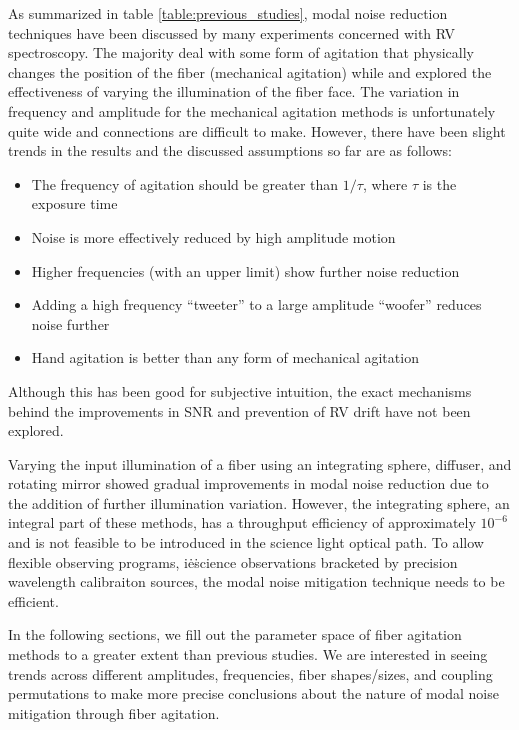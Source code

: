 \documentclass[twocolumn]{emulateapj}
\begin{document}
As summarized in table \ref{table:previous_studies}, modal noise reduction techniques have been discussed by many experiments concerned with RV spectroscopy. The majority deal with some form of agitation that physically changes the position of the fiber (mechanical agitation) while \cite{Mahadevan2014} and \cite{Halverson2014} explored the effectiveness of varying the illumination of the fiber face. The variation in frequency and amplitude for the mechanical agitation methods is unfortunately quite wide and connections are difficult to make. However, there have been slight trends in the results and the discussed assumptions so far are as follows:
\begin{itemize}
\item The frequency of agitation should be greater than $1/\tau$, where $\tau$ is the exposure time \citep{Baudrand2001}
\item Noise is more effectively reduced by high amplitude motion \citep{Lemke2011, McCoy2012}
\item Higher frequencies (with an upper limit) show further noise reduction \citep{Lemke2011}
\item Adding a high frequency ``tweeter'' to a large amplitude ``woofer'' reduces noise further \citep{Plavchan2013}
\item Hand agitation is better than any form of mechanical agitation \citep{Lemke2011, McCoy2012, Mahadevan2014, Roy2014}
\end{itemize}
Although this has been good for subjective intuition, the exact mechanisms behind the improvements in SNR and prevention of RV drift have not been explored.

Varying the input illumination of a fiber using an integrating sphere, diffuser, and rotating mirror showed gradual improvements in modal noise reduction due to the addition of further illumination variation. However, the integrating sphere, an integral part of these methods, has a throughput efficiency of approximately $10^{-6}$ and is not feasible to be introduced in the science light optical path. To allow flexible observing programs, i\.e\. science observations bracketed by precision wavelength calibraiton sources, the modal noise mitigation technique needs to be efficient. 

In the following sections, we fill out the parameter space of fiber agitation methods to a greater extent than previous studies. We are interested in seeing trends across different amplitudes, frequencies, fiber shapes/sizes, and coupling permutations to make more precise conclusions about the nature of modal noise mitigation through fiber agitation.
\end{document}
